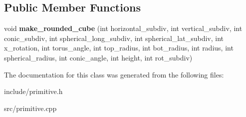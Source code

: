 \subsection*{Public Member Functions}
\begin{DoxyCompactItemize}
\item 
\mbox{\label{classrounded__cube_a7357ea036e57c42393adfeea4abaf113}} 
void {\bfseries make\+\_\+rounded\+\_\+cube} (int horizontal\+\_\+subdiv, int vertical\+\_\+subdiv, int conic\+\_\+subdiv, int spherical\+\_\+long\+\_\+subdiv, int spherical\+\_\+lat\+\_\+subdiv, int x\+\_\+rotation, int torus\+\_\+angle, int top\+\_\+radius, int bot\+\_\+radius, int radius, int spherical\+\_\+radius, int conic\+\_\+angle, int height, int rot\+\_\+subdiv)
\end{DoxyCompactItemize}


The documentation for this class was generated from the following files\+:\begin{DoxyCompactItemize}
\item 
include/primitive.\+h\item 
src/primitive.\+cpp\end{DoxyCompactItemize}
